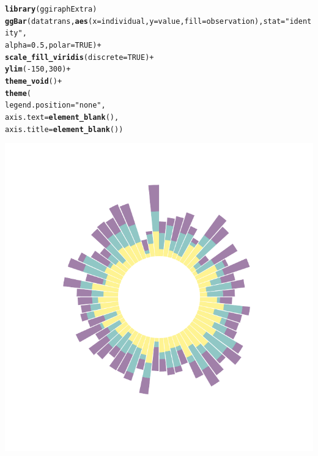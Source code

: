 \documentclass{article}\usepackage[]{graphicx}\usepackage[]{color}
\makeatletter
\def\maxwidth{ %
  \ifdim\Gin@nat@width>\linewidth
    \linewidth
  \else
    \Gin@nat@width
  \fi
}
\newcommand{\hlnum}[1]{\textcolor[rgb]{0.686,0.059,0.569}{#1}}%
\newcommand{\hlstr}[1]{\textcolor[rgb]{0.192,0.494,0.8}{#1}}%
\newcommand{\hlopt}[1]{\textcolor[rgb]{0,0,0}{#1}}%
\newcommand{\hlstd}[1]{\textcolor[rgb]{0.345,0.345,0.345}{#1}}%
\newcommand{\hlkwc}[1]{\textcolor[rgb]{0.333,0.667,0.333}{#1}}%
\newcommand{\hlkwd}[1]{\textcolor[rgb]{0.737,0.353,0.396}{\textbf{#1}}}%
\newenvironment{kframe}{%
 \def\at@end@of@kframe{}%
 \ifinner\ifhmode%
  \def\at@end@of@kframe{\end{minipage}}%
  \begin{minipage}{\columnwidth}%
 \fi\fi%
 \def\FrameCommand##1{\hskip\@totalleftmargin \hskip-\fboxsep
 \colorbox{shadecolor}{##1}\hskip-\fboxsep
     \hskip-\linewidth \hskip-\@totalleftmargin \hskip\columnwidth}%
 \MakeFramed {\advance\hsize-\width
   \@totalleftmargin\z@ \linewidth\hsize
   \@setminipage}}%
 {\par\unskip\endMakeFramed%
 \at@end@of@kframe}
\newenvironment{knitrout}{}{} %
\makeatother
\begin{document}
\begin{knitrout}
\color{fgcolor}\begin{kframe}
\begin{alltt}
\hlkwd{library}\hlstd{(ggiraphExtra)}
\hlkwd{ggBar}\hlstd{(datatrans,} \hlkwd{aes}\hlstd{(}\hlkwc{x}\hlstd{=individual,} \hlkwc{y}\hlstd{=value,} \hlkwc{fill}\hlstd{=observation),} \hlkwc{stat}\hlstd{=}\hlstr{"identity"}\hlstd{,}
      \hlkwc{alpha}\hlstd{=}\hlnum{0.5}\hlstd{,} \hlkwc{polar}\hlstd{=}\hlnum{TRUE}\hlstd{)} \hlopt{+}
  \hlkwd{scale_fill_viridis}\hlstd{(}\hlkwc{discrete}\hlstd{=}\hlnum{TRUE}\hlstd{)} \hlopt{+}
  \hlkwd{ylim}\hlstd{(}\hlopt{-}\hlnum{150}\hlstd{,}\hlnum{300}\hlstd{)} \hlopt{+}
  \hlkwd{theme_void}\hlstd{()} \hlopt{+}
  \hlkwd{theme}\hlstd{(}
    \hlkwc{legend.position} \hlstd{=} \hlstr{"none"}\hlstd{,}
    \hlkwc{axis.text} \hlstd{=} \hlkwd{element_blank}\hlstd{(),}
    \hlkwc{axis.title} \hlstd{=} \hlkwd{element_blank}\hlstd{())}
\end{alltt}
\end{kframe}

{\centering \includegraphics[width=\maxwidth]{figure/ggiraphExtra-1} 

}



\end{knitrout}
\clearpage
\end{document}
